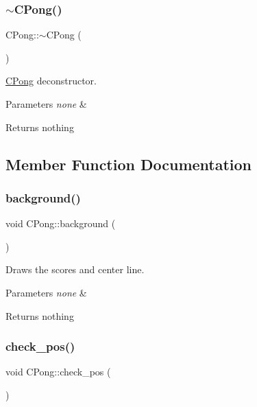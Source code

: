 \subsubsection{\texorpdfstring{$\sim$\+C\+Pong()}{~CPong()}}
{\footnotesize\ttfamily C\+Pong\+::$\sim$\+C\+Pong (\begin{DoxyParamCaption}{ }\end{DoxyParamCaption})}



\hyperlink{class_c_pong}{C\+Pong} deconstructor. 


\begin{DoxyParams}{Parameters}
{\em none} & \\
\hline
\end{DoxyParams}
\begin{DoxyReturn}{Returns}
nothing 
\end{DoxyReturn}


\subsection{Member Function Documentation}
\hypertarget{class_c_pong_a99bf9f1ffa60360e851a2e2bfc6ab379}{}\label{class_c_pong_a99bf9f1ffa60360e851a2e2bfc6ab379} 
\subsubsection{\texorpdfstring{background()}{background()}}
{\footnotesize\ttfamily void C\+Pong\+::background (\begin{DoxyParamCaption}{ }\end{DoxyParamCaption})\hspace{0.3cm}{\ttfamily [private]}}



Draws the scores and center line. 


\begin{DoxyParams}{Parameters}
{\em none} & \\
\hline
\end{DoxyParams}
\begin{DoxyReturn}{Returns}
nothing 
\end{DoxyReturn}
\hypertarget{class_c_pong_ac4bb5edb99ea879275443416dcbdd58f}{}\label{class_c_pong_ac4bb5edb99ea879275443416dcbdd58f} 
\subsubsection{\texorpdfstring{check\+\_\+pos()}{check\_pos()}}
{\footnotesize\ttfamily void C\+Pong\+::check\+\_\+pos (\begin{DoxyParamCaption}{ }\end{DoxyParamCaption})\hspace{0.3cm}{\ttfamily [private]}}



